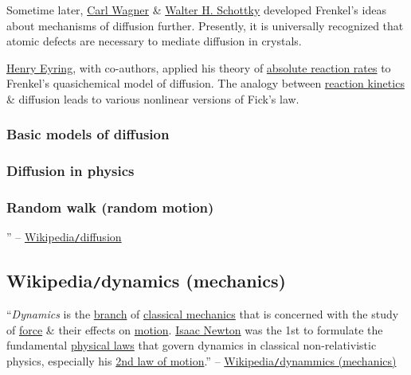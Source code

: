 \documentclass{article}
\begin{document}
Sometime later, \href{https://en.wikipedia.org/wiki/Carl_Wagner}{\sc Carl Wagner} \& \href{https://en.wikipedia.org/wiki/Walter_H._Schottky}{\sc Walter H. Schottky} developed Frenkel's ideas about mechanisms of diffusion further. Presently, it is universally recognized that atomic defects are necessary to mediate diffusion in crystals.

\href{https://en.wikipedia.org/wiki/Henry_Eyring_(chemist)}{\sc Henry Eyring}, with co-authors, applied his theory of \href{https://en.wikipedia.org/wiki/Transition_state_theory}{absolute reaction rates} to Frenkel's quasichemical model of diffusion. The analogy between \href{https://en.wikipedia.org/wiki/Chemical_kinetics}{reaction kinetics} \& diffusion leads to various nonlinear versions of Fick's law.

\subsubsection{Basic models of diffusion}

\subsubsection{Diffusion in physics}

\subsubsection{Random walk (random motion)}

'' -- \href{https://en.wikipedia.org/wiki/Diffusion}{Wikipedia{\tt/}diffusion}


\subsection{Wikipedia{\tt/}dynamics (mechanics)}
``\textit{Dynamics} is the \href{https://en.wikipedia.org/wiki/Branch_(academia)#Physics}{branch} of \href{https://en.wikipedia.org/wiki/Classical_mechanics}{classical mechanics} that is concerned with the study of \href{https://en.wikipedia.org/wiki/Force_(physics)}{force} \& their effects on \href{https://en.wikipedia.org/wiki/Motion_(physics)}{motion}. \href{https://en.wikipedia.org/wiki/Isaac_Newton}{Isaac Newton} was the 1st to formulate the fundamental \href{https://en.wikipedia.org/wiki/Physical_law}{physical laws} that govern dynamics in classical non-relativistic physics, especially his \href{https://en.wikipedia.org/wiki/Second_law_of_motion}{2nd law of motion}.'' -- \href{https://en.wikipedia.org/wiki/Dynamics_(mechanics)}{Wikipedia{\tt/}dynammics (mechanics)}
\end{document}
